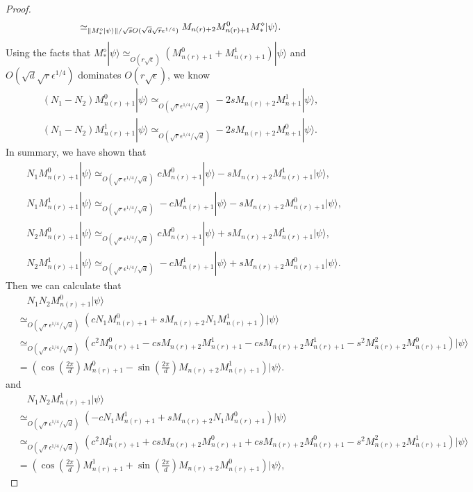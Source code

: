 \documentclass[11pt,letterpaper]{article}
\newcommand{\ket}[1]{|#1\rangle}
\DeclarePairedDelimiter{\norm}{\lVert}{\rVert}
\newcommand{\1}{\mathbb{1}}
\newcommand{\nr}{n(r)}
\newcommand{\se}{\sqrt{\epsilon}}
\newcommand{\qe}{\epsilon^{1/4}}
\newcommand{\sd}{\sqrt{d}}
\newcommand{\sr}{\sqrt{r}}
\newcommand{\appd}[1]{\simeq_{#1}}
\theoremstyle{definition}
\begin{document}
\begin{proof}
\begin{align*}
		\appd{\norm{M_\ast^\diamond \ket{\psi}}/\sqrt{s}O(\sd \sr \qe)}M_{\nr+2} M_{\nr+1}^0 M_\ast^\diamond \ket{\psi}.
	\end{align*}
	Using the facts that $M_\ast^\diamond \ket{\psi} \appd{O(r\se)} (M_{\nr+1}^0 + M_{\nr+1}^1) \ket{\psi}$
	and $O(\sd \sr \qe)$ dominates $O(r \se)$, we know
	\begin{align}
		(N_1-N_2) M_{\nr+1}^0 \ket{\psi} \appd{O(\sr\qe/\sd )} -2sM_{\nr+2} M_{n+1}^1 \ket{\psi},\\
		(N_1-N_2) M_{\nr+1}^1 \ket{\psi}\appd{O(\sr\qe/\sd )} -2sM_{\nr+2} M_{n+1}^0 \ket{\psi}.
	\end{align}
	In summary, we have shown that 
        \begin{align*}
        		&N_1M_{\nr+1}^0 \ket{\psi} \appd{O(\sr \qe/ \sd)} cM_{\nr+1}^0\ket{\psi} - sM_{\nr+2}M_{\nr+1}^1\ket{\psi},\\
        		&N_1M_{\nr+1}^1 \ket{\psi} \appd{O(\sr \qe/ \sd)} -cM_{\nr+1}^1\ket{\psi} - sM_{\nr+2}M_{\nr+1}^0\ket{\psi},\\
        		&N_2M_{\nr+1}^0 \ket{\psi} \appd{O( \sr \qe /\sd)} cM_{\nr+1}^0\ket{\psi} + sM_{\nr+2}M_{\nr+1}^1\ket{\psi},\\
        		&N_2M_{\nr+1}^1 \ket{\psi} \appd{O(\sr \qe/ \sd )} -cM_{\nr+1}^1\ket{\psi} + sM_{\nr+2}M_{\nr+1}^0\ket{\psi}.
        \end{align*}
        Then we can calculate that 
        \begin{align*}
        		&\quad N_1N_2 M_{\nr+1}^0 \ket{\psi} \\
		&\appd{O(\sr \qe/\sd)} (c N_1M_{\nr+1}^0 +sM_{\nr+2}N_1M_{\nr+1}^1)\ket{\psi}\\
        		&\appd{O( \sr \qe/\sd)}(c^2M_{\nr+1}^0- csM_{\nr+2}M_{\nr+1}^1 -csM_{\nr+2}M_{\nr+1}^1 -s^2 M_{\nr+2}^2 M_{\nr+1}^0)\ket{\psi}\\
        		&= (\cos(\frac{2\pi}{d}) M_{\nr+1}^0 - \sin(\frac{2\pi}{d}) M_{\nr+2}M_{\nr+1}^1)\ket{\psi}.
        \end{align*}
        and 
        \begin{align*}
        		&\quad N_1N_2 M_{\nr+1}^1 \ket{\psi} \\
		&\appd{O( \sr \qe/\sd)} (-c N_1M_{\nr+1}^1 +sM_{\nr+2}N_1M_{\nr+1}^0)\ket{\psi}\\
        		&\appd{O(\sr \qe/\sd)}(c^2M_{\nr+1}^1+ csM_{\nr+2}M_{\nr+1}^0 +csM_{\nr+2}M_{\nr+1}^0 -s^2 M_{\nr+2}^2 M_{\nr+1}^1)\ket{\psi}\\
        		&= (\cos(\frac{2\pi}{d}) M_{\nr+1}^1 + \sin(\frac{2\pi}{d}) M_{\nr+2}M_{\nr+1}^0)\ket{\psi},

\end{align*}
\end{proof}
\end{document}
